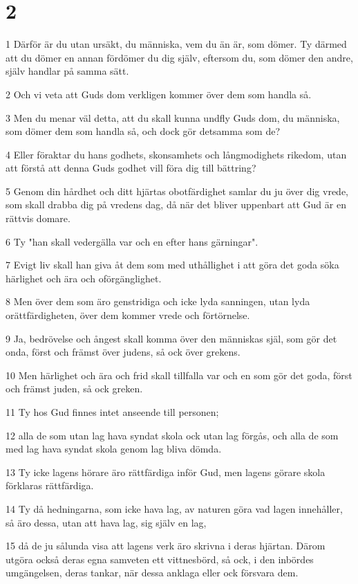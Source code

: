 \chapter{2}

\par 1 Därför är du utan ursäkt, du människa, vem du än är, som dömer. Ty därmed att du dömer en annan fördömer du dig själv, eftersom du, som dömer den andre, själv handlar på samma sätt.
\par 2 Och vi veta att Guds dom verkligen kommer över dem som handla så.
\par 3 Men du menar väl detta, att du skall kunna undfly Guds dom, du människa, som dömer dem som handla så, och dock gör detsamma som de?
\par 4 Eller föraktar du hans godhets, skonsamhets och långmodighets rikedom, utan att förstå att denna Guds godhet vill föra dig till bättring?
\par 5 Genom din hårdhet och ditt hjärtas obotfärdighet samlar du ju över dig vrede, som skall drabba dig på vredens dag, då när det bliver uppenbart att Gud är en rättvis domare.
\par 6 Ty "han skall vedergälla var och en efter hans gärningar".
\par 7 Evigt liv skall han giva åt dem som med uthållighet i att göra det goda söka härlighet och ära och oförgänglighet.
\par 8 Men över dem som äro genstridiga och icke lyda sanningen, utan lyda orättfärdigheten, över dem kommer vrede och förtörnelse.
\par 9 Ja, bedrövelse och ångest skall komma över den människas själ, som gör det onda, först och främst över judens, så ock över grekens.
\par 10 Men härlighet och ära och frid skall tillfalla var och en som gör det goda, först och främst juden, så ock greken.
\par 11 Ty hos Gud finnes intet anseende till personen;
\par 12 alla de som utan lag hava syndat skola ock utan lag förgås, och alla de som med lag hava syndat skola genom lag bliva dömda.
\par 13 Ty icke lagens hörare äro rättfärdiga inför Gud, men lagens görare skola förklaras rättfärdiga.
\par 14 Ty då hedningarna, som icke hava lag, av naturen göra vad lagen innehåller, så äro dessa, utan att hava lag, sig själv en lag,
\par 15 då de ju sålunda visa att lagens verk äro skrivna i deras hjärtan. Därom utgöra också deras egna samveten ett vittnesbörd, så ock, i den inbördes umgängelsen, deras tankar, när dessa anklaga eller ock försvara dem.
